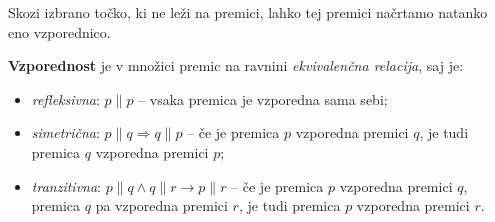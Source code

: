             \begin{aksiom}
                Skozi izbrano točko, ki ne leži na premici, lahko tej premici načrtamo natanko eno vzporednico.

                \begin{figure}[H]
                    \centering

                \end{figure}

            \end{aksiom}

            
                \textbf{Vzporednost} je v množici premic na ravnini \textit{ekvivalenčna relacija}, saj je:
                \begin{itemize}
                    \item \textit{refleksivna}: $p\parallel p$ -- vsaka premica je vzporedna sama sebi;
                    \item \textit{simetrična}: $p\parallel q \Rightarrow q\parallel p$ -- če je premica $p$ vzporedna premici $q$, je tudi premica $q$ vzporedna premici $p$;
                    \item \textit{tranzitivna}: $p\parallel q \land q \parallel r \rightarrow p \parallel r$ -- če je premica $p$ vzporedna premici $q$, premica $q$ pa vzporedna premici $r$, 
                        je tudi premica $p$ vzporedna premici $r$.
                \end{itemize}

                ~\\
        
